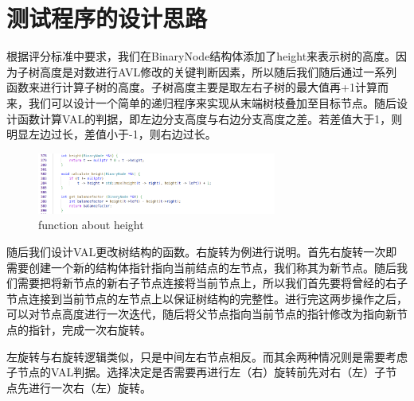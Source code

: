 \documentclass[UTF8]{ctexart}
\begin{document}
	
	\pagestyle{fancy}
	\fancyhead{}
	
	\section{测试程序的设计思路}
	
	根据评分标准中要求，我们在BinaryNode结构体添加了height来表示树的高度。因为子树高度是对数进行AVL修改的关键判断因素，所以随后我们随后通过一系列函数来进行计算子树的高度。子树高度主要是取左右子树的最大值再+1计算而来，我们可以设计一个简单的递归程序来实现从末端树枝叠加至目标节点。随后设计函数计算VAL的判据，即左边分支高度与右边分支高度之差。若差值大于1，则明显左边过长，差值小于-1，则右边过长。
	
	\begin{figure}[H] %
		\centering %
		\includegraphics[width=0.7\textwidth]{fig1} %
		\caption{function about height} %
	\end{figure}
	
	随后我们设计VAL更改树结构的函数。右旋转为例进行说明。首先右旋转一次即需要创建一个新的结构体指针指向当前结点的左节点，我们称其为新节点。随后我们需要把将新节点的新右子节点连接将当前节点上，所以我们首先要将曾经的右子节点连接到当前节点的左节点上以保证树结构的完整性。进行完这两步操作之后，可以对节点高度进行一次迭代，随后将父节点指向当前节点的指针修改为指向新节点的指针，完成一次右旋转。
	
	左旋转与右旋转逻辑类似，只是中间左右节点相反。而其余两种情况则是需要考虑子节点的VAL判据。选择决定是否需要再进行左（右）旋转前先对右（左）子节点先进行一次右（左）旋转。
	
\end{document}
